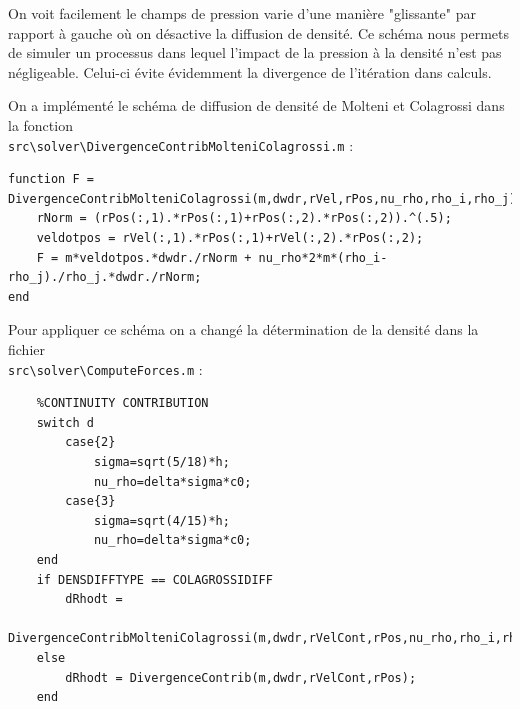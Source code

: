 \documentclass{article}
\begin{document}
On voit facilement le champs de pression varie d'une manière "glissante" par rapport à gauche où on désactive la diffusion de densité. Ce schéma nous permets de simuler un processus dans lequel l'impact de la pression à la densité n'est pas négligeable. Celui-ci évite évidemment la divergence de l'itération dans calculs.

On a implémenté le schéma de diffusion de densité de Molteni et Colagrossi dans la fonction \\
\lstinline$src\solver\DivergenceContribMolteniColagrossi.m$ :
\begin{lstlisting}           
function F = DivergenceContribMolteniColagrossi(m,dwdr,rVel,rPos,nu_rho,rho_i,rho_j)
    rNorm = (rPos(:,1).*rPos(:,1)+rPos(:,2).*rPos(:,2)).^(.5);
    veldotpos = rVel(:,1).*rPos(:,1)+rVel(:,2).*rPos(:,2);
    F = m*veldotpos.*dwdr./rNorm + nu_rho*2*m*(rho_i-rho_j)./rho_j.*dwdr./rNorm;
end
\end{lstlisting} 

Pour appliquer ce schéma on a changé la détermination de la densité dans la fichier \\
\lstinline$src\solver\ComputeForces.m$ :
\begin{lstlisting}           
    %CONTINUITY CONTRIBUTION
    switch d
        case{2}
            sigma=sqrt(5/18)*h;
            nu_rho=delta*sigma*c0;
        case{3}
            sigma=sqrt(4/15)*h;
            nu_rho=delta*sigma*c0;
    end
    if DENSDIFFTYPE == COLAGROSSIDIFF
        dRhodt = 
            DivergenceContribMolteniColagrossi(m,dwdr,rVelCont,rPos,nu_rho,rho_i,rho_j);
    else
        dRhodt = DivergenceContrib(m,dwdr,rVelCont,rPos);
    end
\end{lstlisting} 
\end{document}
